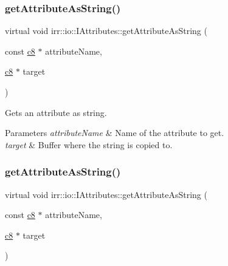 \subsubsection{\texorpdfstring{get\+Attribute\+As\+String()}{getAttributeAsString()}\hspace{0.1cm}{\footnotesize\ttfamily [3/6]}}
{\footnotesize\ttfamily virtual void irr\+::io\+::\+I\+Attributes\+::get\+Attribute\+As\+String (\begin{DoxyParamCaption}\item[{const \hyperlink{namespaceirr_a9395eaea339bcb546b319e9c96bf7410}{c8} $\ast$}]{attribute\+Name,  }\item[{\hyperlink{namespaceirr_a9395eaea339bcb546b319e9c96bf7410}{c8} $\ast$}]{target }\end{DoxyParamCaption})\hspace{0.3cm}{\ttfamily [pure virtual]}}



Gets an attribute as string. 


\begin{DoxyParams}{Parameters}
{\em attribute\+Name} & Name of the attribute to get. \\
\hline
{\em target} & Buffer where the string is copied to. \\
\hline
\end{DoxyParams}
\mbox{\label{classirr_1_1io_1_1IAttributes_a8d10d4874bcb90143ba11f6c548cff42}} 
\subsubsection{\texorpdfstring{get\+Attribute\+As\+String()}{getAttributeAsString()}\hspace{0.1cm}{\footnotesize\ttfamily [4/6]}}
{\footnotesize\ttfamily virtual void irr\+::io\+::\+I\+Attributes\+::get\+Attribute\+As\+String (\begin{DoxyParamCaption}\item[{const \hyperlink{namespaceirr_a9395eaea339bcb546b319e9c96bf7410}{c8} $\ast$}]{attribute\+Name,  }\item[{\hyperlink{namespaceirr_a9395eaea339bcb546b319e9c96bf7410}{c8} $\ast$}]{target }\end{DoxyParamCaption})\hspace{0.3cm}{\ttfamily [pure virtual]}}



